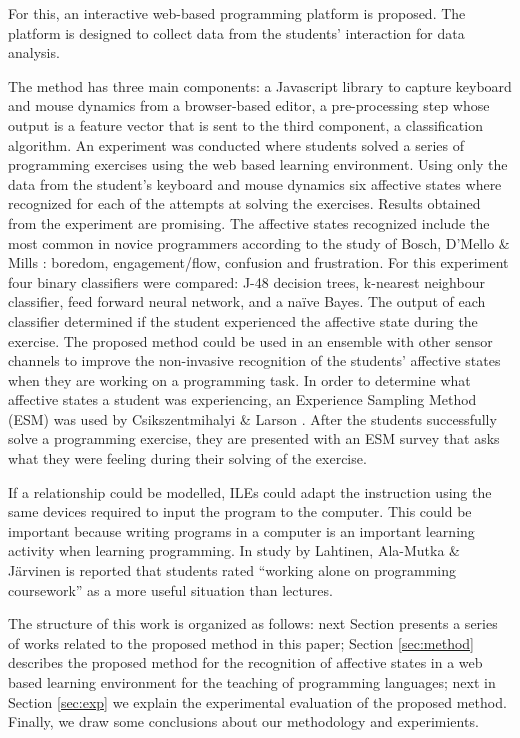 \documentclass[conference]{IEEEtran}
\begin{document}
 

For this, an interactive web-based programming platform
is proposed. The platform is designed to collect data from the students'
interaction for data analysis.

 The method
has three main components: a Javascript library to capture keyboard and mouse
dynamics from a browser-based editor, a pre-processing step whose output is a
feature vector that is sent to the third component, a classification algorithm.
An experiment was conducted where students solved a series of programming
exercises using the web based learning environment. Using only the data from the
student’s keyboard and mouse dynamics six affective states where recognized for
each of the attempts at solving the exercises. Results obtained from the
experiment are promising. The affective states recognized include the most
common in novice programmers according to the study of Bosch, D'Mello \& Mills
\cite{bixler2013detecting}: boredom, engagement/flow, confusion and frustration. For this experiment
four binary classifiers were compared: J-48 decision trees, k-nearest neighbour
classifier, feed forward neural network, and a na\"ive Bayes. The output of each
classifier determined if the student experienced the affective state during the
exercise. The proposed method could be used in an ensemble with other sensor
channels to improve the non-invasive recognition of the students’ affective
states when they are working on a programming task. In order to determine what
affective states a student was experiencing, an Experience Sampling Method (ESM)
was used by Csikszentmihalyi \& Larson \cite{kubey1996experience}. After the students successfully
solve a programming exercise, they are presented with an ESM survey that asks
what they were feeling during their solving of the exercise.

If a relationship could be modelled, ILEs could adapt the instruction using the
same devices required to input the program to the computer. This could be
important because writing programs in a computer is an important learning
activity when learning programming. In study by Lahtinen, Ala-Mutka \& Järvinen
\cite{lahtinen2005study} is reported that students rated ``working alone on programming
coursework'' as a more useful situation than lectures.

The structure of this work is organized as follows: next Section 
presents a series of works related to the proposed method in this paper; Section
\ref{sec:method} describes the proposed method for the recognition of affective
states in a web based learning environment for the teaching of programming
languages; next in Section \ref{sec:exp} we explain the experimental evaluation of the
proposed method. %
Finally, we draw some conclusions about our methodology and
experimients. 
\end{document}
